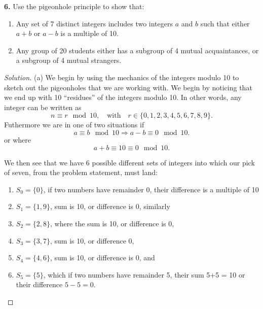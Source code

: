\documentclass[12pt]{amsart}
\newenvironment{solution}
{\begin{proof}[Solution]}
{\end{proof}}
\begin{document}
\begin{onehalfspace}
        \noindent\textbf{6.} Use the pigeonhole principle to show that:
        \begin{enumerate}[label=(\alph*)]
            \item Any set of 7 distinct integers includes two integers $a$ and $b$ such that either $a+b$ or $a-b$ is
                  a multiple of 10.
            \item Any group of 20 students either has a subgroup of 4 mutual acquaintances, or a subgroup of 4 mutual
                  strangers.
        \end{enumerate}
        \begin{solution}
            (a) We begin by using the mechanics of the integers modulo 10 to sketch out
            the pigeonholes that we are working with.
            We begin by noticing that we end up with 10 ``residues'' of the integers
            modulo 10.
            In other words, any integer can be written as
            \begin{displaymath}
                n\equiv r \mod{10},\quad\text{with}\quad r\in\{0,1,2,3,4,5,6,7,8,9\}.
            \end{displaymath}
            Futhermore we are in one of two situations if
            \begin{displaymath}
                a \equiv b \mod{10} \Rightarrow a-b\equiv 0 \mod{10}.
            \end{displaymath}
            or where
            \begin{displaymath}
                a+b\equiv 10 \equiv 0 \mod{10}.
            \end{displaymath}

            We then see that we have 6 possible different sets of integers into which our pick of
            seven, from the problem statement, must land:
            \begin{enumerate}[label=\arabic*.]
                \item $S_0 = \{0\}$, if two numbers have remainder 0, their difference is a multiple of 10
                \item $S_1 = \{1, 9\}$, sum is 10, or difference is 0, similarly
                \item $S_2 = \{2,8\}$, where the sum is 10, or difference is 0,
                \item $S_3 = \{3,7\}$, sum is 10, or difference 0,
                \item $S_4 = \{4,6\}$, sum is 10, or difference is 0, and
                \item $S_5 = \{5\}$, which if two numbers have remainder 5, their sum 5+5 = 10 or their difference
                      $5 - 5 = 0$.
            \end{enumerate}


\end{solution}
\end{onehalfspace}
\end{document}
